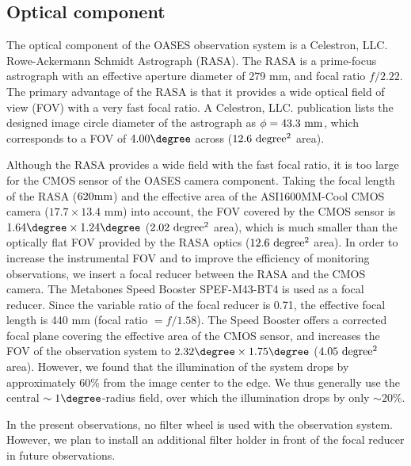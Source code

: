 \documentclass{pasj01}
\begin{document}
\subsection{Optical component}
The optical component of the OASES observation system 
is a Celestron, LLC. Rowe-Ackermann Schmidt Astrograph (RASA).
The RASA is a prime-focus astrograph
with an effective aperture diameter of  279 mm, 
and focal ratio $f/2.22$.
The primary advantage of the RASA is that 
it provides a wide optical field of view (FOV) with a very fast focal ratio.
A Celestron, LLC. publication \citep{berry16} 
lists the designed image circle diameter of the astrograph as $\phi = 43.3 \ {\rm mm}$,
which corresponds to a FOV of $4.00\degree$ across 
($12.6 \ {\rm degree^2}$ area).

Although the RASA provides a wide field with the fast focal ratio,
it is too large for the CMOS sensor 
of the OASES camera component. 
Taking the focal length of the RASA ($620 {\rm mm}$) 
and the effective area of the ASI1600MM-Cool CMOS camera 
($17.7 \times 13.4$ mm) into account,
the FOV covered by the CMOS sensor 
is $1.64\degree \times 1.24\degree$ ($2.02 \ {\rm degree^2}$ area),
which is much smaller than 
the optically flat FOV provided by the RASA optics ($12.6 \ {\rm degree^2}$ area).
In order to increase the instrumental FOV
and to improve the efficiency of monitoring observations,
we insert a focal reducer between the RASA and the CMOS camera.
The Metabones Speed Booster SPEF-M43-BT4
is used as a focal reducer. 
Since the variable ratio of the focal reducer is 0.71, 
the effective focal length is 440 mm (focal ratio $= f/1.58$).
The Speed Booster offers a corrected focal plane
covering the effective area of the CMOS sensor,
and increases the FOV of the observation system to
$2.32\degree \times 1.75\degree$ ($4.05 \ {\rm degree^2}$ area).
However, we found that 
the illumination of the system drops by approximately $60\%$
from the image center to the edge.
We thus generally use the central $\sim 1\degree$-radius field,
over which the illumination drops by only $\sim 20\%$.


In the present observations, no filter wheel is used with the observation system.
However, we plan to install
an additional filter holder in front of the focal reducer in future observations. 
\end{document}
